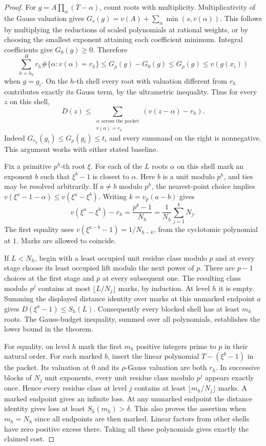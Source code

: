 \begin{proof}
For $g=A\prod_\alpha(T-\alpha)$, count roots with multiplicity. Multiplicativity
of the Gauss valuation gives $G_s(g)=v(A)+\sum_\alpha\min(s,v(\alpha))$.
This follows by multiplying the reductions of scaled polynomials at rational
weights, or by choosing the smallest exponent attaining each coefficient
minimum. Integral coefficients give $G_0(g)\ge0$. Therefore
\[
 \sum_{h=h_0}^H r_h\#\{\alpha:v(\alpha)=r_h\}
 \le G_\rho(g)-G_0(g)\le G_\rho(g)\le v(g(x_i))
\]
when $g=g_i$. On the $h$-th shell every root with valuation different
from $r_h$ contributes exactly its Gauss term, by the ultrametric inequality.
Thus for every $z$ on this shell,
\[
 D(z)\le\sum_{\substack{\alpha\text{ across the packet}\\v(\alpha)=r_h}}
                       (v(z-\alpha)-r_h).
\]
Indeed $G_{r_h}(g_i)\le G_\rho(g_i)\le t_i$ and every summand on the
right is nonnegative. This argument works with either stated baseline.

Fix a primitive $p^h$-th root $\xi$. For each of the $L$ roots $\alpha$ on
this shell mark an exponent $b$ such that $\xi^b-1$ is closest to $\alpha$.
Here $b$ is a unit modulo $p^h$, and ties may be resolved arbitrarily. If
$a\ne b$ modulo $p^h$, the nearest-point choice implies
$v(\xi^a-1-\alpha)\le v(\xi^a-\xi^b)$. Writing $k=v_p(a-b)$ gives
\[
 v(\xi^a-\xi^b)-r_h
 =\frac{p^k-1}{N_h}=\frac1{N_h}\sum_{j=1}^k N_j.
\]
The first equality uses $v(\xi^{a-b}-1)=1/N_{h-k}$, from the cyclotomic
polynomial at $1$. Marks are allowed to coincide.

If $L<N_h$, begin with a least occupied unit residue class modulo $p$ and
at every stage choose its least occupied lift modulo the next power of $p$.
There are $p-1$ choices at the first stage and $p$ at every subsequent one.
The resulting class modulo $p^j$ contains at most $\lfloor L/N_j\rfloor$
marks, by induction. At level $h$ it is empty. Summing the displayed distance
identity over marks at this unmarked endpoint $a$ gives
$D(\xi^a-1)\le S_h(L)$. Consequently every blocked shell has at least
$m_h$ roots. The Gauss-budget inequality, summed over all polynomials,
establishes the lower bound in the theorem.

For equality, on level $h$ mark the first $m_h$ positive integers prime to
$p$ in their natural order. For each marked $b$, insert the linear
polynomial $T-(\xi^b-1)$ in the packet. Its valuation at $0$ and its
$\rho$-Gauss valuation are both $r_h$. In successive blocks of $N_j$ unit
exponents, every unit residue class modulo $p^j$ appears exactly once.
Hence every residue class at level $j$ contains at least
$\lfloor m_h/N_j\rfloor$ marks. A marked endpoint gives an infinite loss.
At any unmarked endpoint the distance identity gives loss at least
$S_h(m_h)>\delta$. This also proves the assertion when $m_h=N_h$ since all
endpoints are then marked. Linear factors from other shells have zero
positive excess there. Taking all these polynomials gives exactly the
claimed cost.
\end{proof}

